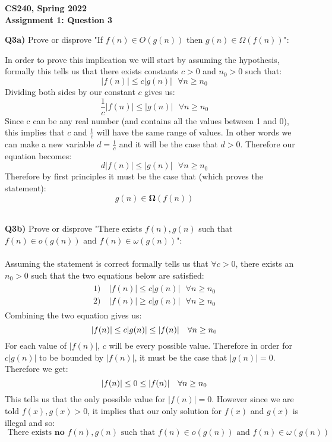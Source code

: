 \documentclass[12pt]{article}
\begin{document}
\begin{center}
{\Large\textbf{CS240, Spring 2022}}\\
\vspace{2mm}
{\Large\textbf{Assignment 1: Question 3}}\\
\vspace{3mm}
\end{center}
\[ \]
\textbf{Q3a)} Prove or disprove "If $f(n) \in O(g(n))$ then $g(n) \in \Omega(f(n))$":\\ 
\begin{adjustwidth}{0em}{0pt}
In order to prove this implication we will start by assuming the hypothesis, formally this tells us that there exists constants $c>0$ and $n_0>0$ such that:
\[ |f(n)| \leq c|g(n)| \ \ \ \forall n \geq n_0 \]
Dividing both sides by our constant $c$ gives us:
\[ \frac{1}{c}|f(n)| \leq |g(n)| \ \ \ \forall n \geq n_0 \]
Since c can be any real number (and contains all the values between 1 and 0), this implies that $c$ and $\frac{1}{c}$ will have the same range of values. In other words we can make a new variable $d = \frac{1}{c}$ and it will be the case that $d >0$. Therefore our equation becomes:
\[ d|f(n)| \leq |g(n)| \ \ \ \forall n \geq n_0 \]
Therefore by first principles it must be the case that (which proves the statement):
\[ g(n) \in \bm{\Omega}(f(n)) \] \\
\end{adjustwidth}

\begin{adjustwidth}{0em}{0pt}
\textbf{Q3b)} Prove or disprove "There exists $f(n), g(n)$ such that $f(n)\in o(g(n))$ and $f(n) \in \omega(g(n))$":\\ \\
Assuming the statement is correct formally tells us that $\forall c>0$, there exists an $n_0>0$ such that the two equations below are satisfied:
\begin{align*}
    \begin{aligned}
       1)& \ |f(n)| \leq c|g(n)| \ \ \ \forall n \geq n_0 \\
       2)& \ |f(n)| \geq c|g(n)| \ \ \ \forall n \geq n_0
    \end{aligned}
\end{align*}
Combining the two equation gives us:
\[ |f(n)| \leq c|g(n)| \leq |f(n)| \ \ \ \forall n \geq n_0 \\ \]
For each value of $|f(n)|$, $c$ will be every possible value. Therefore in order for $c|g(n)|$ to be bounded by $|f(n)|$, it must be the case that $|g(n)| = 0$. Therefore we get:
\[ |f(n)| \leq 0 \leq |f(n)| \ \ \ \forall n \geq n_0 \\ \]
This tells us that the only possible value for $|f(n)| = 0$. However since we are told $f(x),g(x) > 0$, it implies that our only solution for $f(x)$ and $g(x)$ is illegal and so:
\[ \text{ There exists } \textbf{no } f(n), g(n) \text{ such that } f(n)\in o(g(n)) \text{ and } f(n) \in \omega(g(n)) \]

\end{adjustwidth}
\end{document}
